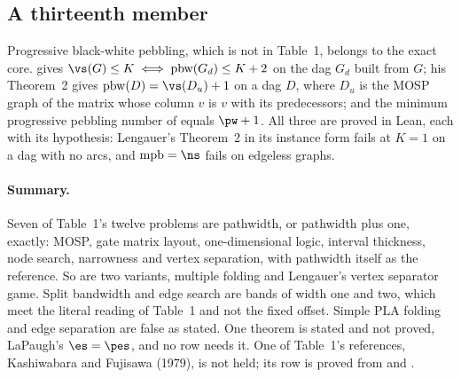 \subsection{A thirteenth member}\label{sec:thirteenth}

Progressive black-white pebbling, which is not in Table~1, belongs to the exact
core. \citet[Thm~3]{LY2002ref14} gives
$\vs(G)\le K\iff\mathrm{pbw}(G_d)\le K+2$ on the dag $G_d$ built from $G$; his
Theorem~2 gives $\mathrm{pbw}(D)=\vs(D_u)+1$ on a dag $D$, where $D_u$ is the
MOSP graph of the matrix whose column $v$ is $v$ with its predecessors; and the
minimum progressive pebbling number of \citet[Thm~3.1]{LY2002ref10} equals
$\pw+1$. All three are proved in Lean, each with its hypothesis: Lengauer's
Theorem~2 in its instance form fails at $K=1$ on a dag with no arcs, and
$\mathrm{mpb}=\ns$ fails on edgeless graphs.

\paragraph{Summary.} Seven of Table~1's twelve problems are pathwidth, or
pathwidth plus one, exactly: MOSP, gate matrix layout, one-dimensional logic,
interval thickness, node search, narrowness and vertex separation, with pathwidth
itself as the reference. So are two variants, multiple folding and Lengauer's
vertex separator game. Split bandwidth and edge search are bands of width one
and two, which meet the literal reading of Table~1 and not the fixed offset.
Simple PLA folding and edge separation are false as stated. One theorem is
stated and not proved, LaPaugh's $\es=\pes$, and no row needs it. One of
Table~1's references, Kashiwabara and Fujisawa (1979), is not held; its row is
proved from \citet{LY2002ref6} and \citet{LY2002ref9}.
